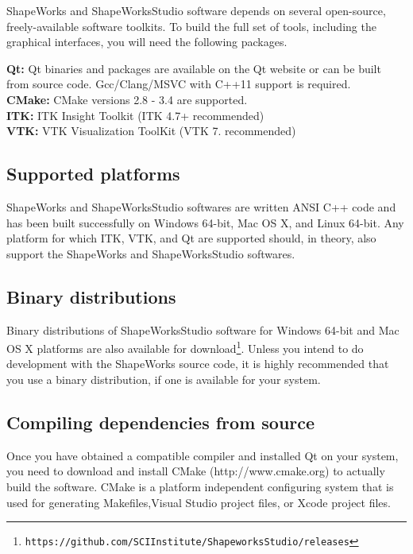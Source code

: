 \documentclass[letterpaper,12pt]{article}   %
\begin{document}
ShapeWorks and ShapeWorksStudio software depends on several open-source, freely-available software toolkits. To build the full set of tools, including the graphical interfaces, you will need the following packages.

\noindent\textbf{Qt:} Qt binaries and packages are available on the Qt website or can be built from source code. Gcc/Clang/MSVC with C++11 support is required.\\
\textbf{CMake:} CMake versions 2.8 - 3.4 are supported.\\
\textbf{ITK:} ITK Insight Toolkit (ITK 4.7+ recommended)\\
\textbf{VTK:} VTK Visualization ToolKit (VTK 7. recommended)\\

\subsection{Supported platforms}

ShapeWorks and ShapeWorksStudio softwares are written ANSI C++ code and has been built successfully on Windows 64-bit, Mac OS X, and Linux 64-bit. Any platform for which ITK, VTK, and Qt are supported should, in theory, also support the ShapeWorks and ShapeWorksStudio softwares.


\subsection{Binary distributions}

Binary distributions of ShapeWorksStudio software for Windows 64-bit and Mac OS X platforms are also available for download\footnote{\texttt{https://github.com/SCIInstitute/ShapeworksStudio/releases}}. Unless you intend to do development with the ShapeWorks source code, it is highly recommended that you use a binary distribution, if one is available for your system.


\subsection{Compiling dependencies from source}

Once you have obtained a compatible compiler and installed Qt on your system, you need to download and install CMake (http://www.cmake.org) to actually build the software. CMake is a platform independent configuring system that is used for generating Makefiles,Visual Studio project files, or Xcode project files.
\end{document}
